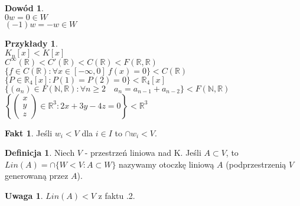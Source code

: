 \documentclass[12pt,a4paper]{article}
\newcommand{\RR}{\mathbb{R}}
\theoremstyle{plain}
\theoremstyle{definition}
\newtheorem{ft}{Fakt}[section]
\theoremstyle{definition}
\newtheorem{df}{Definicja}[section]
\theoremstyle{definition}
\theoremstyle{definition}
\newtheorem*{dd}{Dowód}
\theoremstyle{definition}
\theoremstyle{definition}
\newtheorem*{przy}{Przykłady}
\theoremstyle{definition}
\newtheorem*{uw}{Uwaga}
\begin{document}
\begin{dd} 
    ~\\
    $ 0w = 0 \in W$ \\
    $(-1)w = -w \in W$
\end{dd}
\newpage
\begin{przy}
    ~\\
    $K_n[x] < K[x]$ \\ 
    $C^\infty(\RR) < C'(\RR) < C(\RR) < F(\RR,\RR)$ \\
    $\{f \in C(\RR) : \forall x \in [-\infty,0] \ f(x) = 0\} < C(\RR)$ \\
    $\{P \in \RR_4[x] : P(1) = P(2) = 0\} < \RR_4[x]$ \\
    $\{(a_n) \in F(\mathbb{N},\RR) : \forall n \geqslant 2 \quad a_n = a_{n-1} + a_{n-2} \} < F(\mathbb{N},\RR)$ \\
    $\left\{ 
        \begin{pmatrix}
            x \\ 
            y \\ 
            z 
        \end{pmatrix}
        \in \RR^3 : 2x + 3y - 4z = 0
        \right\} < \RR^3
    $
\end{przy}
\begin{ft}
    Jeśli $w_i < V $ dla $i \in I$ to $\cap w_i < V$.
\end{ft}

\begin{df} 
    Niech $V$ - przestrzeń liniowa nad K. Jeśli $A \subset V$, to \\
    $Lin(A) = \cap \{W < V: A \subset W \}$ nazywamy otoczkę liniową $A$ (podprzestrzenią $V$ generowaną przez $A$).
\end{df}
\begin{uw}
    $Lin(A) < V $ z faktu \thesection.2.
\end{uw}
\end{document}
